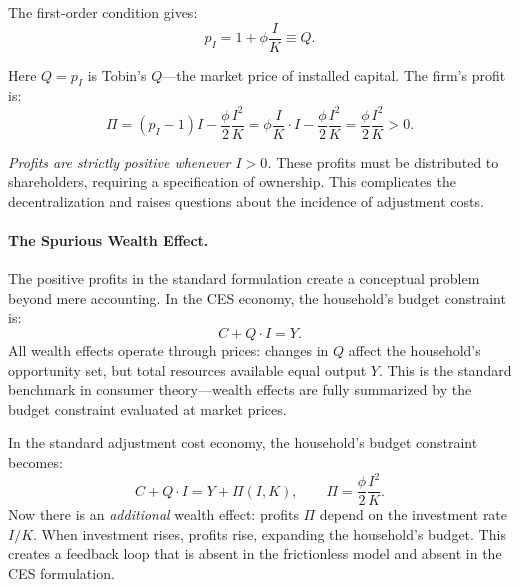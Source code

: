 The first-order condition gives:
\begin{equation}
p_I = 1 + \phi \frac{I}{K} \equiv Q.
\label{eq:ac-standard-Q}
\end{equation}

Here $Q = p_I$ is Tobin's $Q$---the market price of installed capital. The firm's profit is:
\begin{equation}
\Pi = (p_I - 1) I - \frac{\phi}{2} \frac{I^2}{K} = \phi \frac{I}{K} \cdot I - \frac{\phi}{2} \frac{I^2}{K} = \frac{\phi}{2} \frac{I^2}{K} > 0.
\label{eq:ac-standard-profit}
\end{equation}

\emph{Profits are strictly positive whenever $I > 0$.} These profits must be distributed to shareholders, requiring a specification of ownership. This complicates the decentralization and raises questions about the incidence of adjustment costs.

\paragraph{The Spurious Wealth Effect.}
The positive profits in the standard formulation create a conceptual problem beyond mere accounting. In the CES economy, the household's budget constraint is:
\begin{equation}
C + Q \cdot I = Y.
\label{eq:ac-ces-budget}
\end{equation}
All wealth effects operate through prices: changes in $Q$ affect the household's opportunity set, but total resources available equal output $Y$. This is the standard benchmark in consumer theory---wealth effects are fully summarized by the budget constraint evaluated at market prices.

In the standard adjustment cost economy, the household's budget constraint becomes:
\begin{equation}
C + Q \cdot I = Y + \Pi(I, K), \qquad \Pi = \frac{\phi}{2} \frac{I^2}{K}.
\label{eq:ac-standard-budget}
\end{equation}
Now there is an \emph{additional} wealth effect: profits $\Pi$ depend on the investment rate $I/K$. When investment rises, profits rise, expanding the household's budget. This creates a feedback loop that is absent in the frictionless model and absent in the CES formulation.

